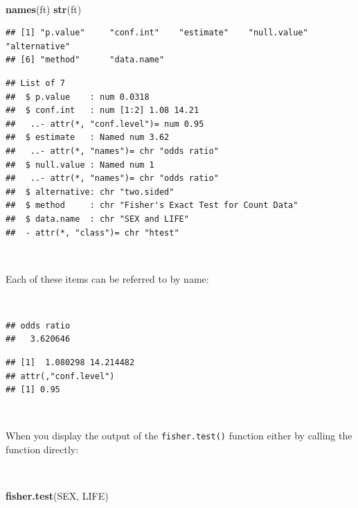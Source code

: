 \documentclass[12pt,a4paper]{book}
\newenvironment{Shaded}{\begin{snugshade}}{\end{snugshade}}
\newcommand{\KeywordTok}[1]{\textcolor[rgb]{0.13,0.29,0.53}{\textbf{#1}}}
\newcommand{\NormalTok}[1]{#1}
\newcommand{\OperatorTok}[1]{\textcolor[rgb]{0.81,0.36,0.00}{\textbf{#1}}}
\theoremstyle{definition}
\theoremstyle{definition}
\theoremstyle{definition}
\theoremstyle{remark}
\begin{document}
~

\begin{Shaded}
\begin{Highlighting}[]
\KeywordTok{names}\NormalTok{(ft)}
\KeywordTok{str}\NormalTok{(ft)}
\end{Highlighting}
\end{Shaded}

\begin{verbatim}
## [1] "p.value"     "conf.int"    "estimate"    "null.value"  "alternative"
## [6] "method"      "data.name"
\end{verbatim}

\begin{verbatim}
## List of 7
##  $ p.value    : num 0.0318
##  $ conf.int   : num [1:2] 1.08 14.21
##   ..- attr(*, "conf.level")= num 0.95
##  $ estimate   : Named num 3.62
##   ..- attr(*, "names")= chr "odds ratio"
##  $ null.value : Named num 1
##   ..- attr(*, "names")= chr "odds ratio"
##  $ alternative: chr "two.sided"
##  $ method     : chr "Fisher's Exact Test for Count Data"
##  $ data.name  : chr "SEX and LIFE"
##  - attr(*, "class")= chr "htest"
\end{verbatim}

~

Each of these items can be referred to by name:

~

\begin{Shaded}
\end{Shaded}

\begin{verbatim}
## odds ratio 
##   3.620646
\end{verbatim}

\begin{verbatim}
## [1]  1.080298 14.214482
## attr(,"conf.level")
## [1] 0.95
\end{verbatim}

~

When you display the output of the \texttt{fisher.test()} function
either by calling the function directly:

~

\begin{Shaded}
\begin{Highlighting}[]
\KeywordTok{fisher.test}\NormalTok{(SEX, LIFE)}
\end{Highlighting}
\end{Shaded}
\end{document}
